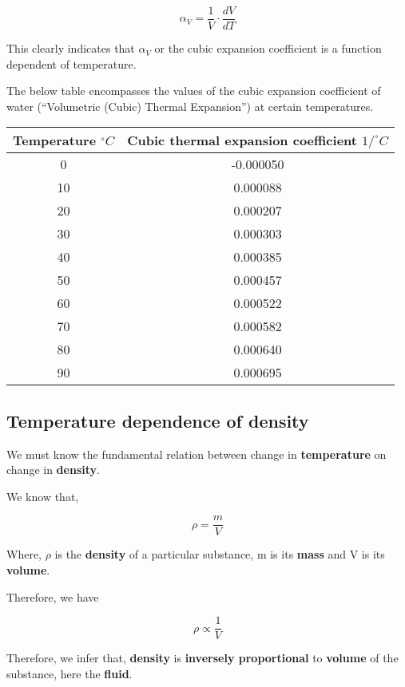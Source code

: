 		$$\alpha_{V} = \frac{1}{V}\cdot\frac{dV}{dT}$$
	
	{This clearly indicates that $\alpha_{V}$ or the cubic expansion coefficient is a function dependent of temperature.}	
	
	{The below table encompasses the values of the cubic expansion coefficient of water (“Volumetric (Cubic) Thermal Expansion”) at certain temperatures.}	
	
	\begin{table}[H]
		\centering
		\begin{tabular}{|c|c|}
		\hline
		\hline
		{Temperature $^\circ C$} & {Cubic thermal expansion coefficient $1/^\circ C$} \\
		\hline
		\hline
		0 & -0.000050 \\
		\hline		
		10 & 0.000088 \\
		\hline
		20 & 0.000207 \\
		\hline
		30 & 0.000303 \\
		\hline
		40 & 0.000385 \\
		\hline
		50 & 0.000457 \\
		\hline
		60 & 0.000522 \\
		\hline
		70 & 0.000582 \\
		\hline
		80 & 0.000640 \\
		\hline
		90 & 0.000695 \\
		\hline
		\hline 
		\end{tabular}
	
	\end{table}

\subsection{{Temperature dependence of density}}
            
	{We must know the fundamental relation between change in \textbf{temperature} on change in \textbf{density}.}
            
    {We know that,}
    
    		$$\rho = \frac{m}{V}$$
            
	{Where, $\rho$ is the \textbf{density} of a particular substance, m is its \textbf{mass} and V is its \textbf{volume}.}            
          
	{Therefore, we have}          
            
		$$\rho \propto \frac{1}{V}$$            
            
	{Therefore, we infer that, \textbf{density} is \textbf{inversely proportional} to \textbf{volume} of the substance, here the \textbf{fluid}.}            
            
